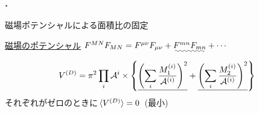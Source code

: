 \documentclass[aspectratio=169,
  a4paper,uplatex,dvipdfmx,11pt,
  xcolor = {dvipsnames,svgnames},
  hyperref ={colorlinks=true,citecolor=Navy,linkcolor=NavyBlue,urlcolor=purple}
]{beamer}
\begin{document}
\begin{frame}
  \frametitle{\thesection.\ \secname}

  \begin{bluebox}{\empty}
    \centering
    磁場ポテンシャルによる面積比の固定
  \end{bluebox}

  \uline{磁場のポテンシャル}\qquad 
  $
    F^{MN}F_{MN}
    =
    F^{\mu\nu}F_{\mu\nu}
    +
    \uwave{F^{mn}F_{mn}}
    +
    \cdots
  $
  \\
  \hspace*{9cm}{\Large $\downarrow$}
  \begin{equation}
    V^{(D)}
    =
    \pi^2
    \prod_{i}\mathcal{A}^{i}
    \times
    \left\{
      \uline{
      \left(  
        \sum_{i}\frac{M_{1}^{(i)}}{\mathcal{A}^{(i)}}
      \right)^2
      }
      +
      \uline{
      \left( 
        \sum_{i}\frac{M_{2}^{(i)}}{\mathcal{A}^{(i)}}
      \right)^2
      }
    \right\}
    \nonumber
  \end{equation}
  \hspace*{6.2cm}
  それぞれがゼロのときに$\ev*{V^{(D)}}=0$\ (最小)

  \begin{center}
  \end{center}


\end{frame}
\end{document}
